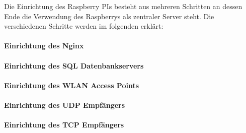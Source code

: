 Die Einrichtung des Raspberry PIs besteht aus mehreren Schritten an dessen Ende die Verwendung des Raspberrys als zentraler Server steht. Die verschiedenen Schritte werden im folgenden erklärt: 
\paragraph{Einrichtung des Nginx}  
\label{sec:Einrichtung des Nginx-1} 

\paragraph{Einrichtung des SQL Datenbankservers}  
\label{sec:Einrichtung des SQL Datenbankservers-1} 

\paragraph{Einrichtung des WLAN Access Points}  
\label{sec:Einrichtung des WLAN Access Points-1} 

\paragraph{Einrichtung des UDP Empfängers}  
\label{sec:Einrichtung des UDP Empfängers-1} 

\paragraph{Einrichtung des TCP Empfängers}  
\label{sec:Einrichtung des TCP Empfängers-1} 
